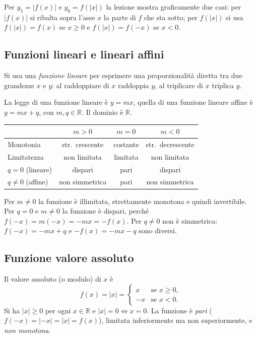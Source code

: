 \documentclass[11pt,a4paper]{article}
\begin{document}
\begin{osservazione}
Per $y_5 = |f(x)|$ e $y_6 = f(|x|)$ la lezione mostra graficamente due casi: per $|f(x)|$ si ribalta sopra l'asse $x$ la parte di $f$ che sta sotto; per $f(|x|)$ si usa $f(|x|) = f(x)$ se $x \ge 0$ e $f(|x|) = f(-x)$ se $x < 0$.
\end{osservazione}

\subsection{Funzioni lineari e lineari affini}

Si usa una \emph{funzione lineare} per esprimere una proporzionalità diretta tra due grandezze $x$ e $y$: al raddoppiare di $x$ raddoppia $y$, al triplicare di $x$ triplica $y$.

La legge di una funzione lineare è $y = mx$, quella di una funzione lineare affine è $y = mx + q$, con $m, q \in \mathbb{R}$. Il dominio è $\mathbb{R}$.

\begin{center}
\renewcommand{\arraystretch}{1.3}
\begin{tabular}{@{}lccc@{}}
\toprule
 & $m > 0$ & $m = 0$ & $m < 0$ \\
\midrule
Monotonia & str.\ crescente & costante & str.\ decrescente \\
Limitatezza & non limitata & limitata & non limitata \\
$q = 0$ (lineare) & dispari & pari & dispari \\
$q \ne 0$ (affine) & non simmetrica & pari & non simmetrica \\
\bottomrule
\end{tabular}
\end{center}

Per $m \ne 0$ la funzione è illimitata, strettamente monotona e quindi invertibile. Per $q = 0$ e $m \neq 0$ la funzione è dispari, perché $f(-x) = m(-x) = -mx = -f(x)$. Per $q \ne 0$ non è simmetrica: $f(-x) = -mx + q$ e $-f(x) = -mx - q$ sono diversi.

\subsection{Funzione valore assoluto}

Il valore assoluto (o modulo) di $x$ è
\[
f(x) = |x| =
\begin{cases}
x & \text{se } x \ge 0, \\
-x & \text{se } x < 0.
\end{cases}
\]
Si ha $|x| \ge 0$ per ogni $x \in \mathbb{R}$ e $|x| = 0 \iff x = 0$. La funzione è \emph{pari} ($f(-x) = |-x| = |x| = f(x)$), limitata inferiormente ma non superiormente, e \emph{non monotona}.
\end{document}
